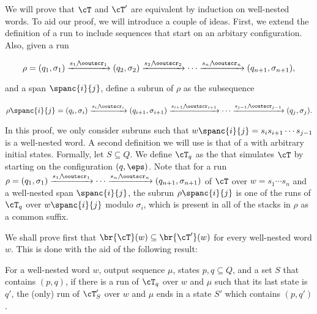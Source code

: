 We will prove that $\cT$ and $\cT'$ are equivalent by induction on well-nested words. To aid our proof, we will introduce a couple of ideas. First, we extend the definition of a run to include sequences that start on an arbitary configuration. Also, given a run 

$$
\rho = (q_1, \sigma_1) \xrightarrow{s_1/\!\ooutscr_1} (q_2, \sigma_2) \xrightarrow{s_2/\!\ooutscr_2} \cdots  \xrightarrow{s_n/\!\ooutscr_n} (q_{n+1}, \sigma_{n+1}),
$$

\noindent and a span $\spanc{i}{j}$, define a subrun of $\rho$ as the subsequence

$$
\rho\spanc{i}{j} = (q_i, \sigma_i) \xrightarrow{s_{i}/\!\ooutscr_{i}} (q_{i+1}, \sigma_{i+1}) \xrightarrow{s_{i+1}/\!\ooutscr_{i+1}} \cdots  \xrightarrow{s_{j-1}/\!\ooutscr_{j-1}} (q_j, \sigma_j).
$$

In this proof, we only consider subruns such that $w\spanc{i}{j} = s_{i}s_{i+1}\cdots s_{j-1}$ is a well-nested word. 
A second definition we will use is that of a \vpt with arbitrary initial states. 
Formally, let $S \subseteq Q$. 
We define $\cT_{q}$ as the \vpt that simulates $\cT$ by starting on the configuration $(q,\eps)$. 
Note that for a run $\rho = (q_1, \sigma_1) \xrightarrow{s_1/\!\ooutscr_1} \cdots  \xrightarrow{s_n/\!\ooutscr_n} (q_{n+1}, \sigma_{n+1})$ of $\cT$ over $w = s_1\cdots s_n$ and a well-nested span $\spanc{i}{j}$, the subrun $\rho\spanc{i}{j}$ is one of the runs of $\cT_{q}$ over $w\spanc{i}{j}$ modulo $\sigma_i$, which is present in all of the stacks in $\rho$ as a common suffix.

We shall prove first that $\br{\cT}(w) \subseteq \br{\cT'}(w)$ for every well-nested word $w$. This is done with the aid of the following result:

\begin{claim}
	For a well-nested word $w$, output sequence $\mu$, states $p,q\subseteq Q$, and a set $S$ that contains $(p,q)$, if there is a run of $\cT_q$ over $w$ and $\mu$ such that its last state is $q'$, the (only) run of $\cT'_{S}$ over $w$ and $\mu$ ends in a state $S'$ which contains $(p,q')$.
\end{claim}

